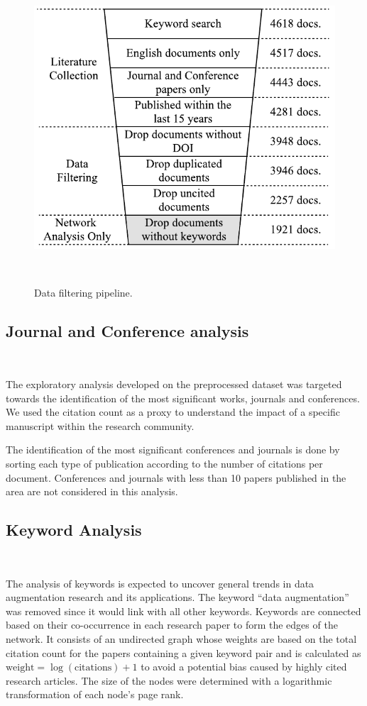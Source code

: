 \documentclass[parskip=full]{scrartcl}
\begin{document}
\begin{figure}[H]
	\centering
    \includegraphics[width=.55\linewidth]{../analysis/data_filtering_pipeline}
    \caption{Data filtering pipeline.
    }~\label{fig:data_filtering_pipeline}
\end{figure}

\subsection{Journal and Conference analysis}~\label{sec:journal_and_conference_analysis}

The exploratory analysis developed on the preprocessed dataset was targeted
towards the identification of the most significant works, journals and
conferences. We used the citation count as a proxy to understand the impact of
a specific manuscript within the research community.

The identification of the most significant conferences and journals is done by
sorting each type of publication according to the number of citations per
document. Conferences and journals with less than 10 papers published in the
area are not considered in this analysis. 

\subsection{Keyword Analysis}~\label{sec:keyword_analysis}

The analysis of keywords is expected to uncover general trends in data
augmentation research and its applications. The keyword ``data augmentation''
was removed since it would link with all other keywords. Keywords are
connected based on their co-occurrence in each research paper to form the
edges of the network.  It consists of an undirected graph whose weights are
based on the total citation count for the papers containing a given keyword
pair and is calculated as $\textrm{weight} = \log(\textrm{citations}) + 1$ to
avoid a potential bias caused by highly cited research articles. The size of
the nodes were determined with a logarithmic transformation of each
node's page rank.
\end{document}
